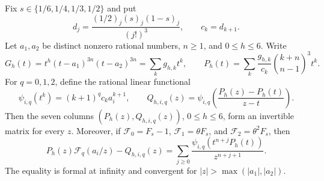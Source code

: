 \begin{lemma}
\label{lem:C-pade-determinant}
Fix $s\in\{1/6,1/4,1/3,1/2\}$ and put
\[
 d_j=\frac{(1/2)_j(s)_j(1-s)_j}{(j!)^3},\qquad c_k=d_{k+1}.
\]
Let $a_1,a_2$ be distinct nonzero rational numbers, $n\ge1$, and
$0\le h\le6$.  Write
\[
 G_h(t)=t^h(t-a_1)^{3n}(t-a_2)^{3n}
       =\sum_k g_{h,k}t^k,
 \qquad
 P_h(t)=\sum_k\frac{g_{h,k}}{c_k}\binom{k+n}{n-1}^{\!3}t^k.
\]
For $q=0,1,2$, define the rational linear functional
\[
 \psi_{i,q}(t^k)=(k+1)^q c_k a_i^{k+1},\qquad
 Q_{h,i,q}(z)=\psi_{i,q}\!\left(
           \frac{P_h(z)-P_h(t)}{z-t}\right).
\]
Then the seven columns $(P_h(z),Q_{h,i,q}(z))$, $0\le h\le6$,
form an invertible matrix for every $z$.  Moreover, if
$\mathcal F_0=F_s-1$, $\mathcal F_1=\theta F_s$, and
$\mathcal F_2=\theta^2F_s$, then
\begin{equation}\label{eq:C-pade-remainder}
 P_h(z)\mathcal F_q(a_i/z)-Q_{h,i,q}(z)
   =\sum_{j\ge0}\frac{\psi_{i,q}(t^{n+j}P_h(t))}{z^{n+j+1}}.
\end{equation}
The equality is formal at infinity and convergent for
$|z|>\max(|a_1|,|a_2|)$.
\end{lemma}

